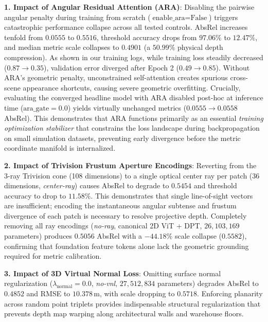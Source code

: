 \noindent\textbf{1. Impact of Angular Residual Attention (ARA)}: Disabling the pairwise angular penalty during training from scratch ($\text{enable\_ara}=\text{False}$) triggers catastrophic performance collapse across all tested controls. AbsRel increases tenfold from $0.0555$ to $0.5516$, threshold accuracy drops from $97.06\%$ to $12.47\%$, and median metric scale collapses to $0.4901$ (a $50.99\%$ physical depth compression). As shown in our training logs, while training loss steadily decreased ($0.87 \to 0.35$), validation error diverged after Epoch 2 ($0.49 \to 0.85$). Without ARA's geometric penalty, unconstrained self-attention creates spurious cross-scene appearance shortcuts, causing severe geometric overfitting. Crucially, evaluating the converged headline model with ARA disabled post-hoc at inference time ($\text{ara\_gate}=0.0$) yields virtually unchanged metrics ($0.0555 \to 0.0558$ AbsRel). This demonstrates that ARA functions primarily as an essential \textit{training optimization stabilizer} that constrains the loss landscape during backpropagation on small simulation datasets, preventing early divergence before the metric coordinate manifold is internalized.

\noindent\textbf{2. Impact of Trivision Frustum Aperture Encodings}: Reverting from the 3-ray Trivision cone (108 dimensions) to a single optical center ray per patch (36 dimensions, \textit{center-ray}) causes AbsRel to degrade to $0.5454$ and threshold accuracy to drop to $11.58\%$. This demonstrates that single line-of-sight vectors are insufficient; encoding the instantaneous angular subtense and frustum divergence of each patch is necessary to resolve projective depth. Completely removing all ray encodings (\textit{no-ray}, canonical 2D ViT + DPT, $26,103,169$ parameters) produces $0.5056$ AbsRel with a $-44.18\%$ scale collapse ($0.5582$), confirming that foundation feature tokens alone lack the geometric grounding required for metric calibration.

\noindent\textbf{3. Impact of 3D Virtual Normal Loss}: Omitting surface normal regularization ($\lambda_{\text{normal}} = 0.0$, \textit{no-vnl}, $27,512,834$ parameters) degrades AbsRel to $0.4852$ and RMSE to $10.378$\,m, with scale dropping to $0.5718$. Enforcing planarity across random point triplets provides indispensable structural regularization that prevents depth map warping along architectural walls and warehouse floors.

